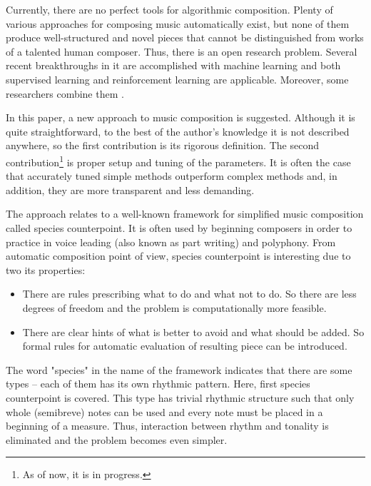 \documentclass{article}
\begin{document}
Currently, there are no perfect tools for algorithmic composition. Plenty of various approaches for composing music automatically exist, but none of them produce well-structured and novel pieces that cannot be distinguished from works of a talented human composer. Thus, there is an open research problem. Several recent breakthroughs in it are accomplished with machine learning and both supervised learning \cite{johnson2017generating, payne2019musenet} and reinforcement learning \cite{smith2012reinforcement} are applicable. Moreover, some researchers combine them \cite{jaques2016generating, kotecha2018bach, kumar2019polyphonic}.

In this paper, a new approach to music composition is suggested. Although it is quite straightforward, to the best of the author's knowledge it is not described anywhere, so the first contribution is its rigorous definition. The second contribution\footnote{As of now, it is in progress.} is proper setup and tuning of the parameters. It is often the case that accurately tuned simple methods outperform complex methods \cite{dacrema2019are} and, in addition, they are more transparent and less demanding.

The approach relates to a well-known framework for simplified music composition called species counterpoint. It is often used by beginning composers in order to practice in voice leading (also known as part writing) and polyphony. From automatic composition point of view, species counterpoint is interesting due to two its properties:
\begin{itemize}
	\item There are rules prescribing what to do and what not to do. So there are less degrees of freedom and the problem is computationally more feasible.
	\item There are clear hints of what is better to avoid and what should be added. So formal rules for automatic evaluation of resulting piece can be introduced.
\end{itemize}

The word "species" in the name of the framework indicates that there are some types -- each of them has its own rhythmic pattern. Here, first species counterpoint is covered. This type has trivial rhythmic structure such that only whole (semibreve) notes can be used and every note must be placed in a beginning of a measure. Thus, interaction between rhythm and tonality is eliminated and the problem becomes even simpler. 
\end{document}
